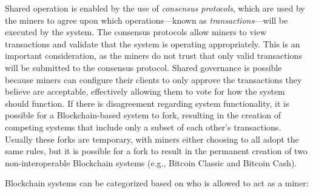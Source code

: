 Shared operation is enabled by the use of \emph{consensus protocols}, which are used by the miners to agree upon which operations---known as \emph{transactions}---will be executed by the system.
The consensus protocols allow miners to view transactions and validate that the 
system is operating appropriately. This is an important consideration, as the 
miners do not trust that only valid transactions will be submitted to the 
consensus protocol.
Shared governance is possible because miners can configure their clients to 
only approve the transactions they believe are acceptable, effectively allowing 
them to vote for how the system should function.
If there is disagreement regarding system functionality, it is possible for a Blockchain-based system to fork, resulting in the creation of competing systems that include only a subset of each other's transactions.
Usually these forks are temporary, with miners either choosing to all adopt the same rules, but it is possible for a fork to result in the permanent creation of two non-interoperable Blockchain systems (e.g., Bitcoin Classic and Bitcoin Cash).


Blockchain systems can be categorized based on who is allowed to act as a miner:

